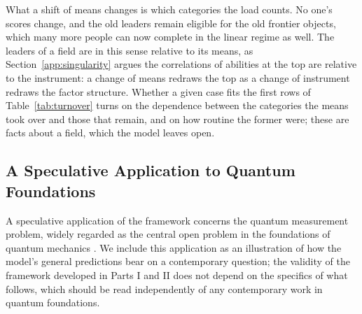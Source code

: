 \documentclass{article}
\begin{document}
What a shift of means changes is which categories the load counts. No one's scores change, and the old leaders remain eligible for the old frontier objects, which many more people can now complete in the linear regime as well. The leaders of a field are in this sense relative to its means, as Section~\ref{app:singularity} argues the correlations of abilities at the top are relative to the instrument: a change of means redraws the top as a change of instrument redraws the factor structure. Whether a given case fits the first rows of Table~\ref{tab:turnover} turns on the dependence between the categories the means took over and those that remain, and on how routine the former were; these are facts about a field, which the model leaves open.

\subsection{A Speculative Application to Quantum Foundations}
A speculative application of the framework concerns the quantum
measurement problem, widely regarded as the central open problem in the
foundations of quantum mechanics \cite{spekkens2010einstein}. We include
this application as an illustration of how the model's general
predictions bear on a contemporary question; the validity of the
framework developed in Parts I and II does not depend on the specifics
of what follows, which should be read independently of any contemporary
work in quantum foundations.
\end{document}
